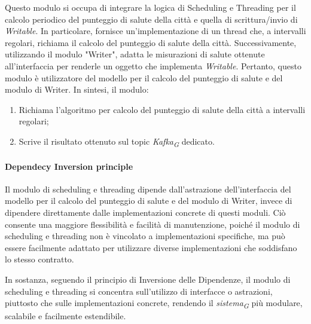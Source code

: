 Questo modulo si occupa di integrare la logica di Scheduling e Threading per il calcolo periodico del punteggio di salute della città e quella di scrittura/invio di \textit{Writable}. In particolare, fornisce un'implementazione di un thread che, a intervalli regolari, richiama il calcolo del punteggio di salute della città. Successivamente, utilizzando il modulo "Writer", adatta le misurazioni di salute ottenute all'interfaccia per renderle un oggetto che implementa \textit{Writable}. Pertanto, questo modulo è utilizzatore del modello per il calcolo del punteggio di salute e del modulo di Writer.
In sintesi, il modulo:
    \begin{enumerate}
        \item Richiama l'algoritmo per calcolo del punteggio di salute della città a intervalli regolari;
        \item Scrive il risultato ottenuto sul topic \textit{Kafka}\textsubscript{\textit{G}} dedicato.
    \end{enumerate}

\paragraph*{Dependecy Inversion principle}
Il modulo di scheduling e threading dipende dall'astrazione dell'interfaccia del modello per il calcolo del punteggio di salute e del modulo di Writer, invece di dipendere direttamente dalle implementazioni concrete di questi moduli. Ciò consente una maggiore flessibilità e facilità di manutenzione, poiché il modulo di scheduling e threading non è vincolato a implementazioni specifiche, ma può essere facilmente adattato per utilizzare diverse implementazioni che soddisfano lo stesso contratto.

In sostanza, seguendo il principio di Inversione delle Dipendenze, il modulo di scheduling e threading si concentra sull'utilizzo di interfacce o astrazioni, piuttosto che sulle implementazioni concrete, rendendo il \textit{sistema}\textsubscript{\textit{G}} più modulare, scalabile e facilmente estendibile.

